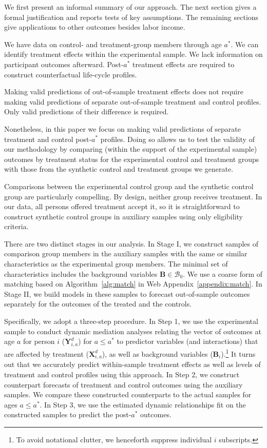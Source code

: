 We first present an informal summary of our approach. The next section gives a formal justification and reports tests of key assumptions. The remaining sections give applications to other outcomes besides labor income.

We have data on control- and treatment-group members through age $a^{\ast}$. We can identify treatment effects within the experimental sample. We lack information on participant outcomes afterward. Post-$a^{\ast}$ treatment effects are required to construct counterfactual life-cycle profiles.

Making valid predictions of out-of-sample treatment effects does not require making valid predictions of separate out-of-sample treatment and control profiles. Only valid predictions of their difference is required.

Nonetheless, in this paper we focus on making valid predictions of separate treatment and control post-$a^*$ profiles. Doing so allows us to test the validity of our methodology by comparing (within the support of the experimental sample) outcomes by treatment status for the experimental control and treatment groups with those from the synthetic control and treatment groups we generate.

Comparisons between the experimental control group and the synthetic control group are particularly compelling. By design, neither group receives treatment. In our data, all persons offered treatment accept it, so it is straightforward to construct synthetic control groups in auxiliary samples using only eligibility criteria.

There are two distinct stages in our analysis. In Stage I, we construct samples of comparison group members in the auxiliary samples with the same or similar characteristics as the experimental group members. The minimal set of characteristics includes the background variables $\bm{B} \in \mathcal{B}_0$. We use a coarse form of matching based on Algorithm~\ref{alg:match} in Web Appendix~\ref{appendix:match}. In Stage II, we build models in these samples to forecast out-of-sample outcomes separately for the outcomes of the treated and the controls.

Specifically, we adopt a three-step procedure. In Step 1, we use the experimental sample to conduct dynamic mediation analyses relating the vector of outcomes at age $a$ for person $i$ ($\bm{Y}^{d}_{i,a}$) for $a\leq a^*$ to predictor variables (and interactions) that are affected by treatment ($\bm{X}^{d}_{i,a}$), as well as background variables ($\bm{B}_i$).\footnote{To avoid notational clutter, we henceforth suppress individual $i$ subscripts.} It turns out that we accurately predict within-sample treatment effects as well as levels of treatment and control profiles using this approach. In Step 2, we construct counterpart forecasts of treatment and control outcomes using the auxiliary samples. We compare these constructed counterparts to the actual samples for ages $a \leq a^\ast$. In Step 3, we use the estimated dynamic relationships fit on the constructed samples to predict the post-$a^{\ast}$ outcomes. 

